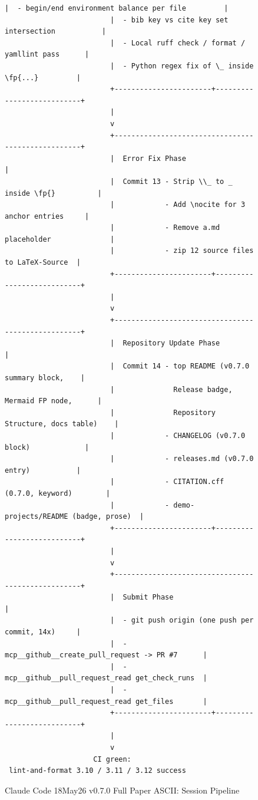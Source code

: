 \begin{figure}[H]
\begin{Verbatim}[fontsize=\scriptsize]
                         |  - begin/end environment balance per file         |
                         |  - bib key vs cite key set intersection           |
                         |  - Local ruff check / format / yamllint pass      |
                         |  - Python regex fix of \_ inside \fp{...}         |
                         +-----------------------+---------------------------+
                         |
                         v
                         +---------------------------------------------------+
                         |  Error Fix Phase                                  |
                         |  Commit 13 - Strip \\_ to _ inside \fp{}          |
                         |            - Add \nocite for 3 anchor entries     |
                         |            - Remove a.md placeholder              |
                         |            - zip 12 source files to LaTeX-Source  |
                         +-----------------------+---------------------------+
                         |
                         v
                         +---------------------------------------------------+
                         |  Repository Update Phase                          |
                         |  Commit 14 - top README (v0.7.0 summary block,    |
                         |              Release badge, Mermaid FP node,      |
                         |              Repository Structure, docs table)    |
                         |            - CHANGELOG (v0.7.0 block)             |
                         |            - releases.md (v0.7.0 entry)           |
                         |            - CITATION.cff (0.7.0, keyword)        |
                         |            - demo-projects/README (badge, prose)  |
                         +-----------------------+---------------------------+
                         |
                         v
                         +---------------------------------------------------+
                         |  Submit Phase                                     |
                         |  - git push origin (one push per commit, 14x)     |
                         |  - mcp__github__create_pull_request -> PR #7      |
                         |  - mcp__github__pull_request_read get_check_runs  |
                         |  - mcp__github__pull_request_read get_files       |
                         +-----------------------+---------------------------+
                         |
                         v
                     CI green:
 lint-and-format 3.10 / 3.11 / 3.12 success
\end{Verbatim}
\caption{Claude Code 18May26 v0.7.0 Full Paper ASCII: Session Pipeline}
\label{fig:network-layout}
\end{figure}
 
